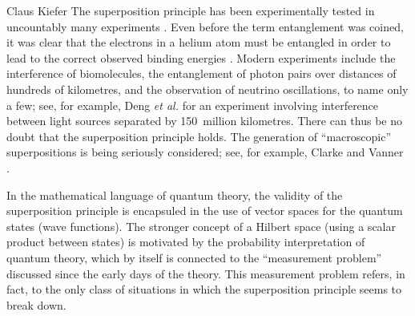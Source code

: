 \begin{artengenv}{Claus Kiefer}
The superposition principle has been experimentally tested
in uncountably many experiments \parencite{schlosshauer_decoherence:_2007,kiefer_albert_2015}.
Even before the term entanglement was coined, it was clear
that the electrons in a helium atom must be
entangled in order to lead to the correct observed binding energies 
\parencite{hylleraas_neue_1929}. Modern experiments include the interference of
biomolecules, the entanglement of photon pairs over distances of
hundreds of kilometres, and the observation of neutrino oscillations,
to name only a few; see, for example, Deng {\em et al.} \parencite*{deng_quantum_2019}
for an experiment involving interference between light sources
separated by 150~million kilometres. There can thus be no doubt that
the superposition 
principle holds. The generation of ``macroscopic'' superpositions is
being seriously considered; see, for example, Clarke and Vanner \parencite*{clarke_growing_2018}. 
 
In the mathematical language of quantum theory,
the validity of the superposition principle is encapsuled in the use
of vector spaces for the quantum states (wave functions). The stronger
concept of a Hilbert space (using a scalar product between states) is
motivated by the probability interpretation of quantum theory, which
by itself is connected to the ``measurement problem'' discussed since
the early days of the theory. This measurement problem refers, in
fact, to the only class of situations in which the superposition
principle seems to break down.


\end{artengenv}
